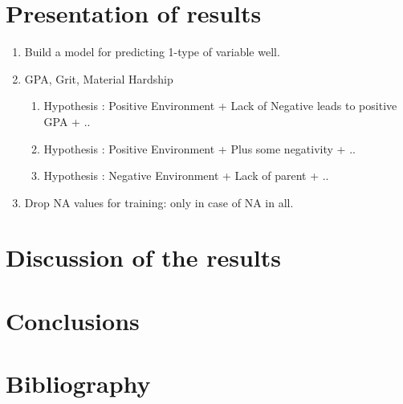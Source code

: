 \documentclass{article} %
\begin{document}
\section{Presentation of results}

\begin{enumerate}
	\item Build a model for predicting 1-type of variable well.
	\item GPA, Grit, Material Hardship
	\begin{enumerate}
		\item Hypothesis : Positive Environment + Lack of Negative leads to positive GPA + ..
		\item Hypothesis : Positive Environment + Plus some negativity + ..
		\item Hypothesis : Negative Environment + Lack of parent + ..
	\end{enumerate}
	\item Drop NA values for training: only in case of NA in all.
\end{enumerate}
\section{Discussion of the results}
\section{Conclusions}
\section{Bibliography}


\end{document}
